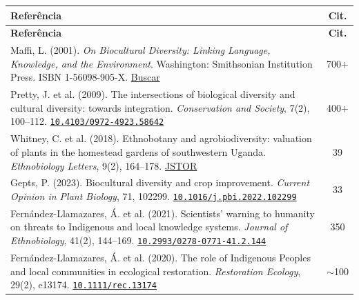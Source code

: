 \documentclass[a4paper,11pt]{article}
\newcommand{\doi}[1]{\href{https://doi.org/#1}{\texttt{#1}}}
\begin{document}
\begin{longtable}{>{\raggedright\arraybackslash}p{} c}
\toprule
\textbf{Referência} & \textbf{Cit.} \\
\midrule
\endfirsthead
\toprule
\textbf{Referência} & \textbf{Cit.} \\
\midrule
\endhead

Maffi, L. (2001). \textit{On Biocultural Diversity: Linking Language, Knowledge, and the Environment}. Washington: Smithsonian Institution Press. ISBN 1-56098-905-X.\newline
\href{https://www.google.com/search?q=Maffi+2001+On+Biocultural+Diversity+Smithsonian}{Buscar} & 700+ \\
\addlinespace

Pretty, J. et al. (2009). The intersections of biological diversity and cultural diversity: towards integration. \textit{Conservation and Society}, 7(2), 100--112.\newline
\doi{10.4103/0972-4923.58642} & 400+ \\
\addlinespace

Whitney, C. et al. (2018). Ethnobotany and agrobiodiversity: valuation of plants in the homestead gardens of southwestern Uganda. \textit{Ethnobiology Letters}, 9(2), 164--178.\newline
\href{https://www.jstor.org/stable/26551443}{JSTOR} & 39 \\
\addlinespace

Gepts, P. (2023). Biocultural diversity and crop improvement. \textit{Current Opinion in Plant Biology}, 71, 102299.\newline
\doi{10.1016/j.pbi.2022.102299} & 33 \\
\addlinespace

Fernández-Llamazares, Á. et al. (2021). Scientists' warning to humanity on threats to Indigenous and local knowledge systems. \textit{Journal of Ethnobiology}, 41(2), 144--169.\newline
\doi{10.2993/0278-0771-41.2.144} & 350 \\
\addlinespace

Fernández-Llamazares, Á. et al. (2020). The role of Indigenous Peoples and local communities in ecological restoration. \textit{Restoration Ecology}, 29(2), e13174.\newline
\doi{10.1111/rec.13174} & $\sim$100 \\

\bottomrule
\end{longtable}
\end{document}
